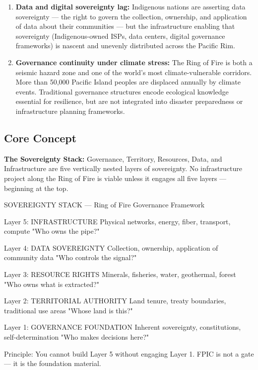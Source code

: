 \documentclass[11pt,letterpaper]{article}
\begin{document}
\begin{enumerate}
  \item \textbf{Data and digital sovereignty lag:} Indigenous nations are asserting data sovereignty --- the right to govern the collection, ownership, and application of data about their communities --- but the infrastructure enabling that sovereignty (Indigenous-owned ISPs, data centers, digital governance frameworks) is nascent and unevenly distributed across the Pacific Rim.

  \item \textbf{Governance continuity under climate stress:} The Ring of Fire is both a seismic hazard zone and one of the world's most climate-vulnerable corridors. More than 50,000 Pacific Island peoples are displaced annually by climate events. Traditional governance structures encode ecological knowledge essential for resilience, but are not integrated into disaster preparedness or infrastructure planning frameworks.
\end{enumerate}

\subsection{Core Concept}

\textbf{The Sovereignty Stack:} Governance, Territory, Resources, Data, and Infrastructure are five vertically nested layers of sovereignty. No infrastructure project along the Ring of Fire is viable unless it engages all five layers --- beginning at the top.

\begin{asciibox}
SOVEREIGNTY STACK — Ring of Fire Governance Framework

Layer 5: INFRASTRUCTURE
    Physical networks, energy, fiber, transport, compute
    "Who owns the pipe?"

Layer 4: DATA SOVEREIGNTY
    Collection, ownership, application of community data
    "Who controls the signal?"

Layer 3: RESOURCE RIGHTS
    Minerals, fisheries, water, geothermal, forest
    "Who owns what is extracted?"

Layer 2: TERRITORIAL AUTHORITY
    Land tenure, treaty boundaries, traditional use areas
    "Whose land is this?"

Layer 1: GOVERNANCE FOUNDATION
    Inherent sovereignty, constitutions, self-determination
    "Who makes decisions here?"

Principle: You cannot build Layer 5 without engaging Layer 1.
FPIC is not a gate — it is the foundation material.
\end{asciibox}
\end{document}
